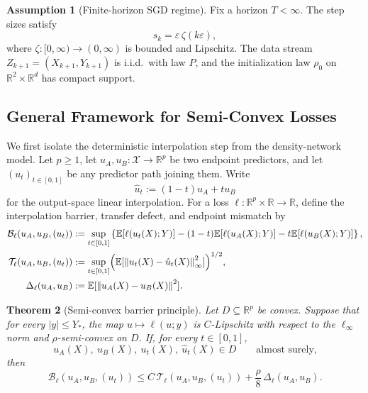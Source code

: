 \documentclass[11pt]{article}
\newtheorem{theorem}{Theorem}[section]
\theoremstyle{definition}
\newtheorem{assumption}[theorem]{Assumption}
\newcommand{\R}{\mathbb{R}}
\newcommand{\E}{\mathbb{E}}
\newcommand{\norm}[1]{\left\lVert #1 \right\rVert}
\newcommand{\abs}[1]{\left\lvert #1 \right\rvert}
\newcommand{\mc}[1]{\mathcal{#1}}
\newcommand{\cB}{\mathcal{B}}
\newcommand{\cT}{\mathcal{T}}
\begin{document}
\begin{assumption}[Finite-horizon SGD regime]
\label{ass:sgd}
Fix a horizon $T<\infty$. The step sizes satisfy
\[
  s_k=\varepsilon\,\zeta(k\varepsilon),
\]
where $\zeta:[0,\infty)\to(0,\infty)$ is bounded and Lipschitz. The data stream
$Z_{k+1}=(X_{k+1},Y_{k+1})$ is i.i.d.\ with law $P$, and the initialization law
$\rho_0$ on $\R^2\times\R^d$ has compact support.
\end{assumption}

\subsection{General Framework for Semi-Convex Losses}

We first isolate the deterministic interpolation step from the density-network
model. Let $p\ge 1$, let $u_A,u_B:\mc{X}\to\R^p$ be two endpoint predictors,
and let $(u_t)_{t\in[0,1]}$ be any predictor path joining them. Write
\[
  \hat u_t:=(1-t)u_A+t u_B
\]
for the output-space linear interpolation. For a loss
$\ell:\R^p\times\R\to\R$, define the interpolation barrier, transfer defect,
and endpoint mismatch by
\begin{align}
  \cB_\ell(u_A,u_B,(u_t))
  &:=
  \sup_{t\in[0,1]}
  \left\{
    \E[\ell(u_t(X);Y)]
    -
    (1-t)\E[\ell(u_A(X);Y)]
    -
    t\E[\ell(u_B(X);Y)]
  \right\},
  \label{eq:generic-barrier}
  \\
  \cT_\ell(u_A,u_B,(u_t))
  &:=
  \sup_{t\in[0,1]}
  \Bigl(
    \E[\norm{u_t(X)-\hat u_t(X)}_\infty^2]
  \Bigr)^{1/2},
  \label{eq:generic-transfer}
  \\
  \Delta_\ell(u_A,u_B)
  &:=
  \E[\norm{u_A(X)-u_B(X)}^2].
  \label{eq:generic-delta}
\end{align}

\begin{theorem}[Semi-convex barrier principle]
\label{thm:semiconvex-barrier}
Let $D\subseteq\R^p$ be convex. Suppose that for every $\abs{y}\le Y_\ast$,
the map $u\mapsto \ell(u;y)$ is $C$-Lipschitz with respect to the
$\ell_\infty$ norm and $\rho$-semi-convex on $D$. If, for every $t\in[0,1]$,
\[
  u_A(X),\ u_B(X),\ u_t(X),\ \hat u_t(X)\in D
  \qquad
  \text{almost surely,}
\]
then
\begin{equation}
  \cB_\ell(u_A,u_B,(u_t))
  \le
  C\,\cT_\ell(u_A,u_B,(u_t))
  +
  \frac{\rho}{8}\,\Delta_\ell(u_A,u_B).
  \label{eq:semiconvex-barrier}
\end{equation}
\end{theorem}
\end{document}
